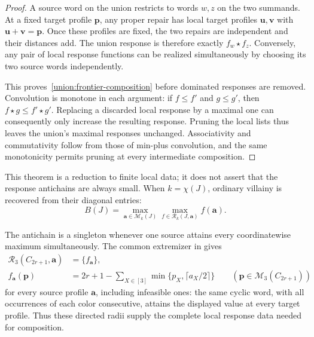 \documentclass[10pt,a4paper]{amsart}
\numberwithin{equation}{section}
\theoremstyle{definition}
\theoremstyle{remark}
\begin{document}
\begin{proof}
A source word on the union restricts to words $w,z$ on the two
summands. At a fixed target profile $\mathbf p$, any proper repair
has local target profiles $\mathbf u,\mathbf v$ with
$\mathbf u+\mathbf v=\mathbf p$. Once these profiles are fixed,
the two repairs are independent and their distances add. The union
response is therefore exactly $f_w\star f_z$. Conversely, any pair
of local response functions can be realized simultaneously by choosing
its two source words independently.

This proves~\eqref{union:frontier-composition} before dominated
responses are removed. Convolution is monotone in each argument:
if $f\le f'$ and $g\le g'$, then $f\star g\le f'\star g'$.
Replacing a discarded local response by a maximal one can consequently
only increase the resulting response. Pruning the local lists thus
leaves the union's maximal responses unchanged. Associativity and
commutativity follow from those of min-plus convolution, and the same
monotonicity permits pruning at every intermediate composition.
\end{proof}

This theorem is a reduction to finite local data; it does not assert
that the response antichains are always small. When $k=\chi(J)$,
ordinary villainy is recovered from their diagonal entries:
\begin{equation}\label{union:response-diagonal}
 B(J)=\max_{\mathbf a\in\mathcal M_k(J)}
       \max_{f\in\mathcal R_k(J,\mathbf a)}f(\mathbf a).
\end{equation}

The antichain is a singleton whenever one source attains every
coordinatewise maximum simultaneously. The common extremizer in
\cite[Theorem~3.15]{jiang2026exact} gives
\[
\begin{aligned}
 \mathcal R_3(C_{2r+1},\mathbf a)&=\{f_{\mathbf a}\},\\
 f_{\mathbf a}(\mathbf p)&=2r+1-
 \sum_{X\in[3]}\min\{p_X,\lceil a_X/2\rceil\}
 \qquad(\mathbf p\in\mathcal M_3(C_{2r+1}))
\end{aligned}
\]
for every source profile $\mathbf a$, including infeasible ones:
the same cyclic word, with all occurrences of each color consecutive,
attains the displayed value at every target profile.
Thus these directed radii supply the complete local response
data needed for composition.
\end{document}
